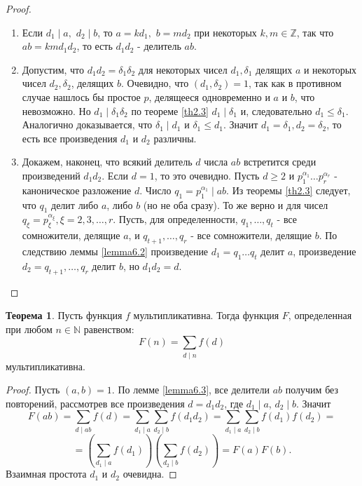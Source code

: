 \documentclass[a4paper, 12pt]{article}
\newcommand{\N}{\mathbb{N}}
\newcommand{\Z}{\mathbb{Z}}
\renewcommand{\div}{\mid}
\newcommand\tab[1][.5cm]{\hspace*{#1}}
\theoremstyle{definition}
\newtheorem{theorem}{Теорема}[section]
\begin{document}
    \begin{proof} \tab
        \begin{enumerate}
            \item Если $d_1 \div a,$ $d_2 \div b$, то $a=kd_1,$ $b=md_2$ при некоторых $k,m\in \Z$, так что $ab=kmd_1d_2$, то есть $d_1d_2$ - делитель $ab$.
            \item Допустим, что $d_1d_2=\delta_1\delta_2$ для некоторых чисел $d_1, \delta_1$ делящих $a$ и некоторых чисел $d_2, \delta_2$, делящих $b$. Очевидно, что $(d_1,\delta_2)=1$, так как в противном случае нашлось бы простое $p$, делящееся одновременно и $a$ и $b$, что невозможно. Но $d_1 \div \delta_1\delta_2$ по теореме \ref{th2.3} $d_1 \div \delta_1$ и, следовательно $d_1\leq \delta_1$. Аналогично доказывается, что $\delta_1\div d_1$ и $\delta_1\leq d_1$. Значит $d_1=\delta_1, d_2=\delta_2$, то есть все произведения $d_1$ и $d_2$ различны.
            \item Докажем, наконец, что всякий делитель $d$ числа $ab$ встретится среди произведений $d_1d_2$. Если $d=1$, то это очевидно. Пусть $d\geq 2$ и $p_1^{\alpha_1}\dots p_r^{\alpha_r}$ - каноническое разложение $d$. Число $q_1=p_1^{\alpha_1} \div ab$. Из теоремы \ref{th2.3} следует, что $q_1$ делит либо $a$, либо $b$ (но не оба сразу). То же верно и для чисел $q_{\xi}=p_{\xi}^{\alpha_{\xi}}, \xi=2,3,\dots,r$. Пусть, для определенности, $q_1,\dots, q_t$ - все сомножители, делящие $a$, и $q_{t+1},\dots, q_r$ - все сомножители, делящие $b$. По следствию леммы \ref{lemma6.2} произведение $d_1=q_1\dots q_t$ делит $a$, произведение $d_2=q_{t+1},\dots, q_r$ делит $b$, но $d_1d_2=d$.
        \end{enumerate}
    \end{proof}
    \begin{theorem} \label{th6.2}
        Пусть функция $f$ мультипликативна. Тогда функция $F$, определенная при любом $n\in \N$ равенством:
        $$F(n)=\sum\limits_{d\div n}f(d)$$
        мультипликативна.
    \end{theorem}
    \begin{proof}
        Пусть $(a,b)=1$. По лемме \ref{lemma6.3}, все делители $ab$ получим без повторений, рассмотрев все произведения $d=d_1d_2$, где $d_1 \div a$, $d_2 \div b$. Значит
        $$F(ab)=\sum\limits_{d\div ab}f(d)=\sum\limits_{d_1 \div a}\sum\limits_{d_2 \div b}f(d_1d_2)=\sum\limits_{d_1 \div a}\sum\limits_{d_2 \div b}f(d_1)f(d_2)=$$
        $$=(\sum\limits_{d_1 \div a}f(d_1))(\sum\limits_{d_2 \div b}f(d_2))=F(a)F(b).$$
        Взаимная простота $d_1$ и $d_2$ очевидна.
    \end{proof} 
\end{document}
